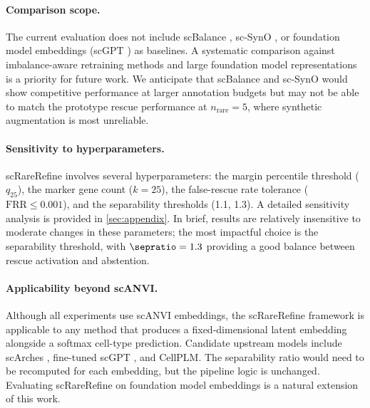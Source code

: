 \paragraph{Comparison scope.}
The current evaluation does not include scBalance \citep{xu2023scbalance}, sc-SynO \citep{mulvey2021scsyno}, or foundation model embeddings (scGPT \citep{cui2024scgpt}) as baselines. A systematic comparison against imbalance-aware retraining methods and large foundation model representations is a priority for future work. We anticipate that scBalance and sc-SynO would show competitive performance at larger annotation budgets but may not be able to match the prototype rescue performance at $n_\text{rare} = 5$, where synthetic augmentation is most unreliable.

\paragraph{Sensitivity to hyperparameters.}
scRareRefine involves several hyperparameters: the margin percentile threshold ($q_{25}$), the marker gene count ($k = 25$), the false-rescue rate tolerance ($\text{FRR} \leq 0.001$), and the separability thresholds (1.1, 1.3). A detailed sensitivity analysis is provided in \cref{sec:appendix}. In brief, results are relatively insensitive to moderate changes in these parameters; the most impactful choice is the separability threshold, with $\sepratio = 1.3$ providing a good balance between rescue activation and abstention.

\paragraph{Applicability beyond scANVI.}
Although all experiments use scANVI embeddings, the scRareRefine framework is applicable to any method that produces a fixed-dimensional latent embedding alongside a softmax cell-type prediction. Candidate upstream models include scArches \citep{lotfollahi2022mapping}, fine-tuned scGPT \citep{cui2024scgpt}, and CellPLM. The separability ratio would need to be recomputed for each embedding, but the pipeline logic is unchanged. Evaluating scRareRefine on foundation model embeddings is a natural extension of this work.
